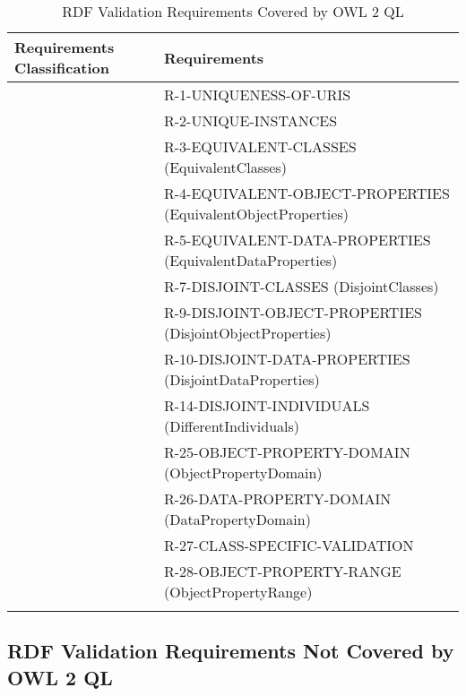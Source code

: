 \documentclass{llncs}
\newcommand{\hr}{\hline\noalign{\smallskip}} %
\begin{document}
\begin{table}
\caption{RDF Validation Requirements Covered by OWL 2 QL}
\label{tab:RequirementsCoveredOWL2QL}
\centering
\begin{tabular}{ll}
\hr
Requirements Classification & Requirements \\
\hr
& R-1-UNIQUENESS-OF-URIS \\
& R-2-UNIQUE-INSTANCES \\
& R-3-EQUIVALENT-CLASSES (EquivalentClasses) \\
& R-4-EQUIVALENT-OBJECT-PROPERTIES (EquivalentObjectProperties) \\
& R-5-EQUIVALENT-DATA-PROPERTIES (EquivalentDataProperties) \\
& R-7-DISJOINT-CLASSES (DisjointClasses) \\
& R-9-DISJOINT-OBJECT-PROPERTIES (DisjointObjectProperties) \\
& R-10-DISJOINT-DATA-PROPERTIES (DisjointDataProperties) \\
& R-14-DISJOINT-INDIVIDUALS (DifferentIndividuals) \\
& R-25-OBJECT-PROPERTY-DOMAIN (ObjectPropertyDomain) \\
& R-26-DATA-PROPERTY-DOMAIN (DataPropertyDomain) \\
& R-27-CLASS-SPECIFIC-VALIDATION \\
& R-28-OBJECT-PROPERTY-RANGE (ObjectPropertyRange) \\
\hr
\end{tabular}
\end{table}

\subsection{RDF Validation Requirements Not Covered by OWL 2 QL}
\end{document}
